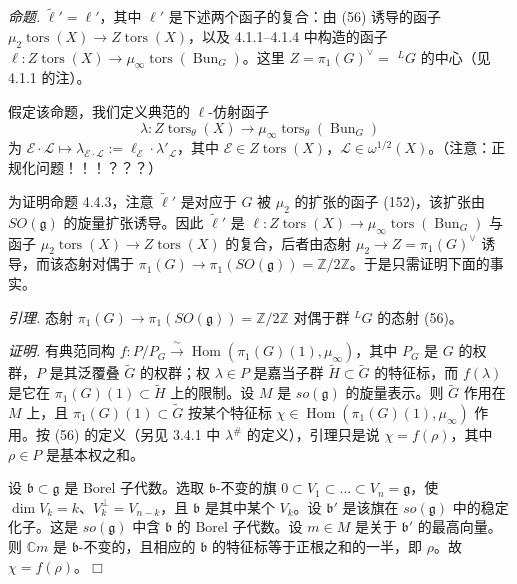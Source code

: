  \emph{命题.} $\tilde\ell'=\ell'$，其中 $\ell'$ 是下述两个函子的复合：由 (56) 诱导的函子 $\mu_{2}\operatorname{tors}(X)\to Z\operatorname{tors}(X)$，以及 4.1.1–4.1.4 中构造的函子 $\ell:Z\operatorname{tors}(X)\to\mu_{\infty}\operatorname{tors}(\operatorname{Bun}_{G})$。这里 $Z=\pi_{1}(G)^{\vee}=$ ${}^{L}G$ 的中心（见 4.1.1 的注）。

假定该命题，我们定义典范的 $\ell$-仿射函子
\begin{equation}\tag{211}
\lambda:Z\operatorname{tors}_{\theta}(X)\to\mu_{\infty}\operatorname{tors}_{\theta}(\operatorname{Bun}_{G})
\end{equation}
为 $\mathcal{E}\cdot\mathcal{L}\mapsto\lambda_{\mathcal{E}\cdot\mathcal{L}}:=\ell_{\mathcal{E}}\cdot\lambda'_{\mathcal{L}}$，其中 $\mathcal{E}\in Z\operatorname{tors}(X)$，$\mathcal{L}\in\omega^{1/2}(X)$。（注意：正规化问题！！！？？？）

为证明命题 4.4.3，注意 $\tilde\ell'$ 是对应于 $G$ 被 $\mu_{2}$ 的扩张的函子 (152)，该扩张由 $SO(\mathfrak{g})$ 的旋量扩张诱导。因此 $\tilde\ell'$ 是 $\ell:Z\operatorname{tors}(X)\to\mu_{\infty}\operatorname{tors}(\operatorname{Bun}_{G})$ 与函子 $\mu_{2}\operatorname{tors}(X)\to Z\operatorname{tors}(X)$ 的复合，后者由态射 $\mu_{2}\to Z=\pi_{1}(G)^{\vee}$ 诱导，而该态射对偶于 $\pi_{1}(G)\to\pi_{1}(SO(\mathfrak{g}))=\mathbb{Z}/2\mathbb{Z}$。于是只需证明下面的事实。


 \emph{引理.} 态射 $\pi_{1}(G)\to\pi_{1}(SO(\mathfrak{g}))=\mathbb{Z}/2\mathbb{Z}$ 对偶于群 ${}^{L}G$ 的态射 (56)。

\emph{证明.} 有典范同构 $f:P/P_{G}\xrightarrow{\ \sim\ }\operatorname{Hom}(\pi_{1}(G)(1),\mu_{\infty})$，其中 $P_{G}$ 是 $G$ 的权群，$P$ 是其泛覆叠 $\tilde{G}$ 的权群；权 $\lambda\in P$ 是嘉当子群 $\tilde{H}\subset\tilde{G}$ 的特征标，而 $f(\lambda)$ 是它在 $\pi_{1}(G)(1)\subset\tilde{H}$ 上的限制。设 $M$ 是 $so(\mathfrak{g})$ 的旋量表示。则 $\tilde{G}$ 作用在 $M$ 上，且 $\pi_{1}(G)(1)\subset\tilde{G}$ 按某个特征标 $\chi\in\operatorname{Hom}(\pi_{1}(G)(1),\mu_{\infty})$ 作用。按 (56) 的定义（另见 3.4.1 中 $\lambda^{\#}$ 的定义），引理只是说 $\chi=f(\rho)$，其中 $\rho\in P$ 是基本权之和。

设 $\mathfrak{b}\subset\mathfrak{g}$ 是 Borel 子代数。选取 $\mathfrak{b}$-不变的旗 $0\subset V_{1}\subset\ldots\subset V_{n}=\mathfrak{g}$，使 $\dim V_{k}=k$、$V_{k}^{\perp}=V_{n-k}$，且 $\mathfrak{b}$ 是其中某个 $V_{k}$。设 $\mathfrak{b}'$ 是该旗在 $so(\mathfrak{g})$ 中的稳定化子。这是 $so(\mathfrak{g})$ 中含 $\mathfrak{b}$ 的 Borel 子代数。设 $m\in M$ 是关于 $\mathfrak{b}'$ 的最高向量。则 $\mathbb{C}m$ 是 $\mathfrak{b}$-不变的，且相应的 $\mathfrak{b}$ 的特征标等于正根之和的一半，即 $\rho$。故 $\chi=f(\rho)$。\hfill$\Box$

